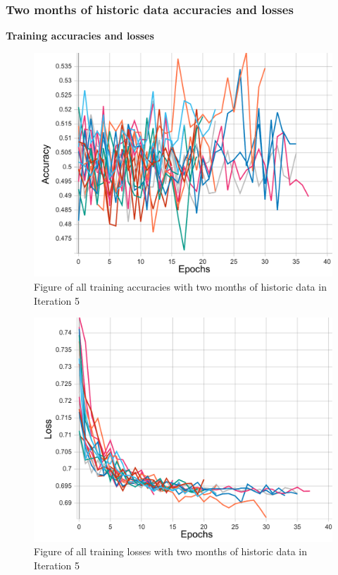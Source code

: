 \subsubsection{Two months of historic data accuracies and losses}
\textbf{Training accuracies and losses}
\begin{figure}[ht]
    \centering
    \includegraphics[width=0.575\columnwidth]{figures/results/final/two_months_acc_t.pdf}
    \caption[Training accuracies for Iteration 5 with two months of historic data]{Figure of all training accuracies with two months of historic data in Iteration 5}
    \label{fig:iteration5_two_months_train_accuracy}
\end{figure}
\FloatBarrier

\begin{figure}[ht]
    \centering
    \includegraphics[width=0.575\columnwidth]{figures/results/final/two_months_loss_t.pdf}
    \caption[Training losses for Iteration 5 with two months of historic data]{Figure of all training losses with two months of historic data in Iteration 5}
    \label{fig:iteration5_two_months_train_loss}
\end{figure}
\FloatBarrier

